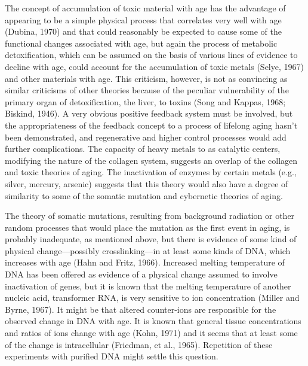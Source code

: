 The concept of accumulation of toxic material with age has the advantage of appearing to be a simple physical process that
correlates very well with age (Dubina, 1970) and that could reasonably be expected to cause some of the functional changes
associated with age, but again the process of metabolic detoxification, which can be assumed on the basis of various lines of
evidence to decline with age, could account for the accumulation of toxic metals (Selye, 1967) and other materials with age. This
criticism, however, is not as convincing as similar criticisms of other theories because of the peculiar vulnerability of the primary
organ of detoxification, the liver, to toxins (Song and Kappas, 1968; Biskind, 1946). A very obvious positive feedback system
must be involved, but the appropriateness of the feedback concept to a process of lifelong aging hasn't been
demonstrated, and regenerative and higher control processes would add further complications. The capacity of heavy metals to 
as catalytic centers, modifying the nature of the collagen system, suggests an overlap of the collagen and toxic theories of aging. The
inactivation of enzymes by certain metals (e.g., silver, mercury, arsenic) suggests that this theory would also have a degree of
similarity to some of the somatic mutation and cybernetic theories of aging.

The theory of somatic mutations, resulting from background radiation or other random processes that would place the mutation as the 
first event in aging, is probably inadequate, as mentioned above, but there is evidence of some kind of physical change---possibly
crosslinking---in at least some kinds of DNA, which increases with age (Hahn and Fritz, 1966). Increased melting temperature of DNA has been
offered as evidence of a physical change assumed to involve inactivation of genes, but it is known that the melting temperature of another
nucleic acid, transformer RNA, is very sensitive to ion concentration (Miller and Byrne, 1967). It might be that altered counter-ions are
responsible for the observed change in DNA with age. It is known that general tissue concentrations and ratios of ions change with age (Kohn, 1971) and
it seems that at least some of the change is intracellular (Friedman, et al., 1965). Repetition of these experiments with purified DNA might
settle this question.

